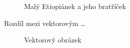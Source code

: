 \documentclass[a4paper, 11pt]{article}
\begin{document}
\begin{figure}[htb]
\begin{center}
{    }
    \caption{Malý Etiopiánek a jeho bratříček}
    \label{obr:1}
  \end{center}
\end{figure}

\cleardoublepage
Rozdíl mezi vektorovým \dots
\begin{figure}[htb]
  \begin{center}
    \caption{Vektorový obrázek}
    \label{obr:2}
  \end{center}
\end{figure}
\end{document}
